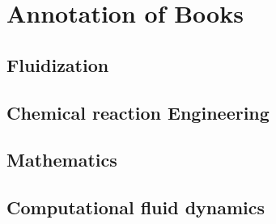 \chapter{Annotation of Books}
\section{Fluidization}

\section{Chemical reaction Engineering}

\section{Mathematics}

\section{Computational fluid dynamics}